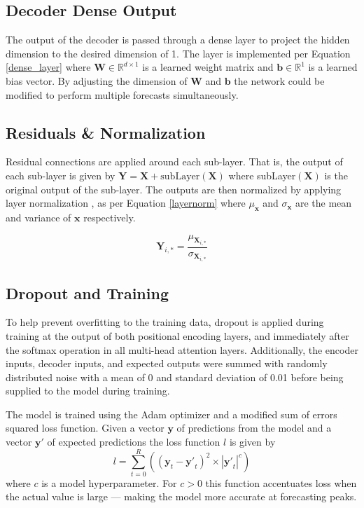 \subsection{Decoder Dense Output}
The output of the decoder is passed through a dense layer to project the hidden dimension to the desired dimension of 1.
The layer is implemented per Equation \ref{dense_layer} where $\boldsymbol{W} \in \mathbb{R}^{d \times 1}$ is a learned weight matrix and $\boldsymbol{b} \in \mathbb{R}^{1}$ is a learned bias vector.
By adjusting the dimension of $\boldsymbol{W}$ and $\boldsymbol{b}$ the network could be modified to perform multiple forecasts simultaneously.


\subsection{Residuals \& Normalization}
Residual connections \cite{He2015} are applied around each sub-layer.
That is, the output of each sub-layer is given by $\boldsymbol{Y} = \boldsymbol{X} + \text{subLayer}(\boldsymbol{X})$ where subLayer$(\boldsymbol{X})$ is the original output of the sub-layer.
The outputs are then normalized by applying layer normalization \cite{Ba2016}, as per Equation \ref{layernorm} where $\mu_{\boldsymbol{x}}$ and $\sigma_{\boldsymbol{x}}$ are the mean and variance of $\boldsymbol{x}$ respectively.

\begin{equation} \label{layernorm}
\boldsymbol{Y}_{i,*} = \frac{\mu_{\boldsymbol{X}_{i,*}}}{\sigma_{\boldsymbol{X}_{i,*}}}
\end{equation}

\subsection{Dropout and Training}
To help prevent overfitting to the training data, dropout \cite{srivastava14a} is applied during training at the output of both positional encoding layers, and immediately after the softmax operation in all multi-head attention layers.
Additionally, the encoder inputs, decoder inputs, and expected outputs were summed with randomly distributed noise with a mean of 0 and standard deviation of 0.01 before being supplied to the model during training.

The model is trained using the Adam optimizer \cite{Kingma2014} and a modified sum of errors squared loss function.
Given a vector $\boldsymbol{y}$ of predictions from the model and a vector $\boldsymbol{y'}$ of expected predictions the loss function $l$ is given by 
\begin{equation}
l = \sum_{t=0}^{R}((\boldsymbol{y}_t - \boldsymbol{y'}_t)^2 \times |\boldsymbol{y'}_t|^c)
\end{equation}
where $c$ is a model hyperparameter.
For $c>0$ this function accentuates loss when the actual value is large --- making the model more accurate at forecasting peaks.

